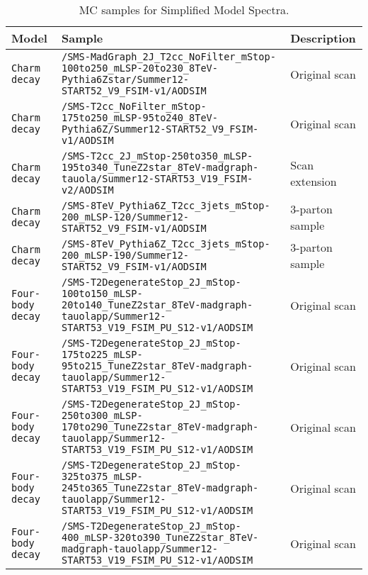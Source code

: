\begin{landscape}
  \begin{center}
    \begin{table}[ht]
      \caption{MC samples for Simplified Model Spectra.}
      \label{tab:mc-signal}
      \centering
      \tiny
      \begin{tabular}{ lll }
        \hline
        Model & Sample & Description \\
        \hline
        \hline
        \verb!Charm decay!     & \verb!/SMS-MadGraph_2J_T2cc_NoFilter_mStop-100to250_mLSP-20to230_8TeV-Pythia6Zstar/Summer12-START52_V9_FSIM-v1/AODSIM! & Original scan \\
        \verb!Charm decay!     & \verb!/SMS-T2cc_NoFilter_mStop-175to250_mLSP-95to240_8TeV-Pythia6Z/Summer12-START52_V9_FSIM-v1/AODSIM! & Original scan \\
        \verb!Charm decay!     & \verb!/SMS-T2cc_2J_mStop-250to350_mLSP-195to340_TuneZ2star_8TeV-madgraph-tauola/Summer12-START53_V19_FSIM-v2/AODSIM! & Scan extension \\
        \verb!Charm decay!     & \verb!/SMS-8TeV_Pythia6Z_T2cc_3jets_mStop-200_mLSP-120/Summer12-START52_V9_FSIM-v1/AODSIM! & 3-parton sample \\
        \verb!Charm decay!     & \verb!/SMS-8TeV_Pythia6Z_T2cc_3jets_mStop-200_mLSP-190/Summer12-START52_V9_FSIM-v1/AODSIM! & 3-parton sample \\
        \verb!Four-body decay! & \verb!/SMS-T2DegenerateStop_2J_mStop-100to150_mLSP-20to140_TuneZ2star_8TeV-madgraph-tauolapp/Summer12-START53_V19_FSIM_PU_S12-v1/AODSIM! & Original scan \\
        \verb!Four-body decay! & \verb!/SMS-T2DegenerateStop_2J_mStop-175to225_mLSP-95to215_TuneZ2star_8TeV-madgraph-tauolapp/Summer12-START53_V19_FSIM_PU_S12-v1/AODSIM! & Original scan \\
        \verb!Four-body decay! & \verb!/SMS-T2DegenerateStop_2J_mStop-250to300_mLSP-170to290_TuneZ2star_8TeV-madgraph-tauolapp/Summer12-START53_V19_FSIM_PU_S12-v1/AODSIM! & Original scan \\
        \verb!Four-body decay! & \verb!/SMS-T2DegenerateStop_2J_mStop-325to375_mLSP-245to365_TuneZ2star_8TeV-madgraph-tauolapp/Summer12-START53_V19_FSIM_PU_S12-v1/AODSIM! & Original scan \\
        \verb!Four-body decay! & \verb!/SMS-T2DegenerateStop_2J_mStop-400_mLSP-320to390_TuneZ2star_8TeV-madgraph-tauolapp/Summer12-START53_V19_FSIM_PU_S12-v1/AODSIM! & Original scan \\
        \hline
        \hline
      \end{tabular}
    \end{table}
  \end{center}
\end{landscape}

